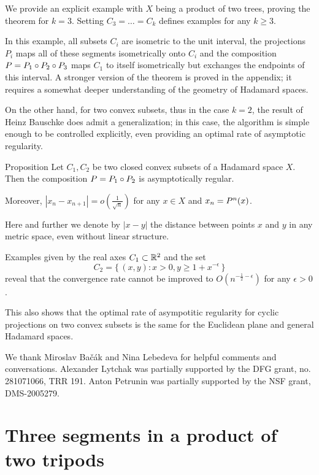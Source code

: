 \documentclass[a4paper,10pt]{article}
\begin{document}

We provide an explicit example with $X$ being a product of two trees, proving the theorem for $k=3$.
Setting $C_3=\dots=C_k$ defines examples for any $k\geq 3$.

In this example, all subsets $C_i$ are isometric to the unit interval, the projections $P_i$ maps all of these segments isometrically onto $C_i$ and the composition $P\z=P_1\circ P_2\circ P_3$ maps $C_1$ to itself isometrically but exchanges the endpoints
of this interval.
A stronger version of the theorem is proved in the appendix;
it requires a somewhat deeper understanding of the geometry of Hadamard spaces.

On the other hand, for two convex subsets, thus in the case $k=2$,  the result of Heinz Bauschke \cite{bauschke}  does admit a generalization;  in this case, the algorithm is simple enough to be controlled explicitly, even providing an optimal rate of asymptotic regularity.


\begin{thm}{Proposition} \label{prop}
Let $C_1,C_2$ be two closed convex subsets of a Hadamard space $X$.
Then the composition $P\z=  P_1\circ P_2$ is asymptotically  regular.

Moreover, $|x_n-x_{n+1}| =o (\frac  {1} {\sqrt n})$ for any  $x\in X$ and $x_n \z= P^n (x)$.
\end{thm}

Here and further we denote by $|x-y|$ the distance between points $x$ and $y$ in any metric space, even without linear structure.

Examples given by the real axes $C_1 \subset \mathbb{R}^2$ and the set
\[C_2  = \{\,(x,y):x>0, y \geq 1+ x^{ -\epsilon}\,\}\]
reveal that the convergence rate cannot be improved to $O (n^{-\frac 1 2  -\epsilon})$ for any $\epsilon >0$. 

This also shows that the optimal rate of asympotitic regularity for cyclic projections on two convex subsets is the same for the Euclidean plane and general Hadamard spaces. 

We thank Miroslav Bačák and Nina Lebedeva for helpful comments and conversations.
Alexander Lytchak was partially supported by the DFG grant, no. 281071066, TRR 191.
Anton Petrunin was partially supported by the NSF grant, DMS-2005279.

\section{Three segments in a product of two tripods}\label{sec:tripods}
\end{document}
